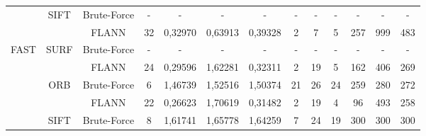 \begin{table}[h!]
{\begin{tabular}{|c|c|c|c|c|c|c|c|c|c|c|c|c|}
				& \multirow{-2}{*}{SIFT} & Brute-Force & -                          & -                               & -                               & -                               & -                         & -                          & -                         & -                           & -   & -                           \\ \cline{2-13} 
				&                        & FLANN       & \cellcolor[HTML]{32CB00}32 & \cellcolor[HTML]{32CB00}0,32970 & \cellcolor[HTML]{32CB00}0,63913 & \cellcolor[HTML]{32CB00}0,39328 & \cellcolor[HTML]{32CB00}2 & \cellcolor[HTML]{32CB00}7  & \cellcolor[HTML]{32CB00}5 & 257                         & 999 & 483                         \\ \cline{3-13} 
				\multirow{-6}{*}{FAST}   & \multirow{-2}{*}{SURF} & Brute-Force & -                          & -                               & -                               & -                               & -                         & -                          & -                         & -                           & -   & -                           \\ \hline
				&                        & FLANN       & \cellcolor[HTML]{32CB00}24 & \cellcolor[HTML]{32CB00}0,29596 & 1,62281                         & \cellcolor[HTML]{32CB00}0,32311 & \cellcolor[HTML]{32CB00}2 & 19                         & \cellcolor[HTML]{32CB00}5 & \cellcolor[HTML]{32CB00}162 & 406 & \cellcolor[HTML]{32CB00}269 \\ \cline{3-13} 
				& \multirow{-2}{*}{ORB}  & Brute-Force & 6                          & 1,46739                         & 1,52516                         & 1,50374                         & 21                        & 26                         & 24                        & 259                         & 280 & \cellcolor[HTML]{32CB00}272 \\ \cline{2-13} 
				&                        & FLANN       & 22                         & \cellcolor[HTML]{32CB00}0,26623 & 1,70619                         & \cellcolor[HTML]{32CB00}0,31482 & \cellcolor[HTML]{32CB00}2 & 19                         & \cellcolor[HTML]{32CB00}4 & \cellcolor[HTML]{32CB00}96  & 493 & \cellcolor[HTML]{32CB00}258 \\ \cline{3-13} 
				& \multirow{-2}{*}{SIFT} & Brute-Force & 8                          & 1,61741                         & 1,65778                         & 1,64259                         & 7                         & 24                         & 19                        & 300                         & 300 & \cellcolor[HTML]{32CB00}300 \\ \cline{2-13} 

\end{tabular}}
\end{table}

